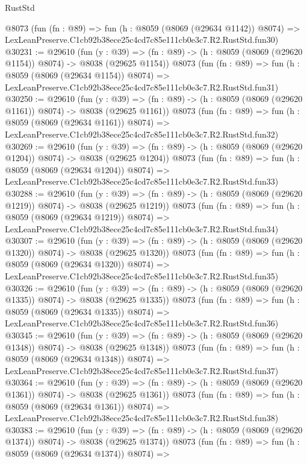 \begin{lexlean}{RustStd}
\begin{coremodule}
    @8073
    (fun (fn : @89) =>
    fun (h : @8059 (@8069 (@29634 @1142)) @8074) =>
    LexLeanPreserve.C1cb92b38ece25c4cd7c85e111cb0e3c7.R2.RustStd.fun30)
@30231 := @29610
    (fun (y : @39) =>
    (fn : @89) -> (h : @8059 (@8069 (@29620 @1154)) @8074) -> @8038 (@29625 @1154))
    @8073
    (fun (fn : @89) =>
    fun (h : @8059 (@8069 (@29634 @1154)) @8074) =>
    LexLeanPreserve.C1cb92b38ece25c4cd7c85e111cb0e3c7.R2.RustStd.fun31)
@30250 := @29610
    (fun (y : @39) =>
    (fn : @89) -> (h : @8059 (@8069 (@29620 @1161)) @8074) -> @8038 (@29625 @1161))
    @8073
    (fun (fn : @89) =>
    fun (h : @8059 (@8069 (@29634 @1161)) @8074) =>
    LexLeanPreserve.C1cb92b38ece25c4cd7c85e111cb0e3c7.R2.RustStd.fun32)
@30269 := @29610
    (fun (y : @39) =>
    (fn : @89) -> (h : @8059 (@8069 (@29620 @1204)) @8074) -> @8038 (@29625 @1204))
    @8073
    (fun (fn : @89) =>
    fun (h : @8059 (@8069 (@29634 @1204)) @8074) =>
    LexLeanPreserve.C1cb92b38ece25c4cd7c85e111cb0e3c7.R2.RustStd.fun33)
@30288 := @29610
    (fun (y : @39) =>
    (fn : @89) -> (h : @8059 (@8069 (@29620 @1219)) @8074) -> @8038 (@29625 @1219))
    @8073
    (fun (fn : @89) =>
    fun (h : @8059 (@8069 (@29634 @1219)) @8074) =>
    LexLeanPreserve.C1cb92b38ece25c4cd7c85e111cb0e3c7.R2.RustStd.fun34)
@30307 := @29610
    (fun (y : @39) =>
    (fn : @89) -> (h : @8059 (@8069 (@29620 @1320)) @8074) -> @8038 (@29625 @1320))
    @8073
    (fun (fn : @89) =>
    fun (h : @8059 (@8069 (@29634 @1320)) @8074) =>
    LexLeanPreserve.C1cb92b38ece25c4cd7c85e111cb0e3c7.R2.RustStd.fun35)
@30326 := @29610
    (fun (y : @39) =>
    (fn : @89) -> (h : @8059 (@8069 (@29620 @1335)) @8074) -> @8038 (@29625 @1335))
    @8073
    (fun (fn : @89) =>
    fun (h : @8059 (@8069 (@29634 @1335)) @8074) =>
    LexLeanPreserve.C1cb92b38ece25c4cd7c85e111cb0e3c7.R2.RustStd.fun36)
@30345 := @29610
    (fun (y : @39) =>
    (fn : @89) -> (h : @8059 (@8069 (@29620 @1348)) @8074) -> @8038 (@29625 @1348))
    @8073
    (fun (fn : @89) =>
    fun (h : @8059 (@8069 (@29634 @1348)) @8074) =>
    LexLeanPreserve.C1cb92b38ece25c4cd7c85e111cb0e3c7.R2.RustStd.fun37)
@30364 := @29610
    (fun (y : @39) =>
    (fn : @89) -> (h : @8059 (@8069 (@29620 @1361)) @8074) -> @8038 (@29625 @1361))
    @8073
    (fun (fn : @89) =>
    fun (h : @8059 (@8069 (@29634 @1361)) @8074) =>
    LexLeanPreserve.C1cb92b38ece25c4cd7c85e111cb0e3c7.R2.RustStd.fun38)
@30383 := @29610
    (fun (y : @39) =>
    (fn : @89) -> (h : @8059 (@8069 (@29620 @1374)) @8074) -> @8038 (@29625 @1374))
    @8073
    (fun (fn : @89) =>
    fun (h : @8059 (@8069 (@29634 @1374)) @8074) =>

\end{coremodule}
\end{lexlean}
